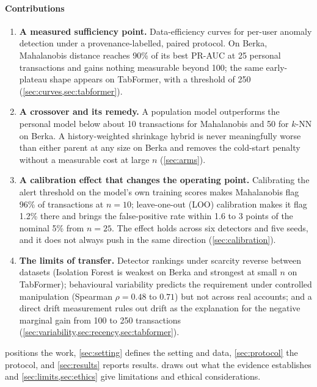\paragraph*{Contributions}
\begin{enumerate}
\item \textbf{A measured sufficiency point.} Data-efficiency curves for per-user anomaly detection under a provenance-labelled, paired protocol. On Berka, Mahalanobis distance reaches 90\% of its best PR-AUC at 25 personal transactions and gains nothing measurable beyond 100; the same early-plateau shape appears on TabFormer, with a threshold of 250 (\cref{sec:curves,sec:tabformer}).
\item \textbf{A crossover and its remedy.} A population model outperforms the personal model below about 10 transactions for Mahalanobis and 50 for $k$-NN on Berka. A history-weighted shrinkage hybrid is never meaningfully worse than either parent at any size on Berka and removes the cold-start penalty without a measurable cost at large $n$ (\cref{sec:arms}).
\item \textbf{A calibration effect that changes the operating point.} Calibrating the alert threshold on the model's own training scores makes Mahalanobis flag 96\% of transactions at $n=10$; leave-one-out (LOO) calibration makes it flag 1.2\% there and brings the false-positive rate within 1.6 to 3 points of the nominal 5\% from $n=25$. The effect holds across six detectors and five seeds, and it does not always push in the same direction (\cref{sec:calibration}).
\item \textbf{The limits of transfer.} Detector rankings under scarcity reverse between datasets (Isolation Forest is weakest on Berka and strongest at small $n$ on TabFormer); behavioural variability predicts the requirement under controlled manipulation (Spearman $\rho=0.48$ to $0.71$) but not across real accounts; and a direct drift measurement rules out drift as the explanation for the negative marginal gain from 100 to 250 transactions (\cref{sec:variability,sec:recency,sec:tabformer}).
\end{enumerate}

 positions the work, \cref{sec:setting} defines the setting and data, \cref{sec:protocol} the protocol, and \cref{sec:results} reports results.  draws out what the evidence establishes and \cref{sec:limits,sec:ethics} give limitations and ethical considerations.
